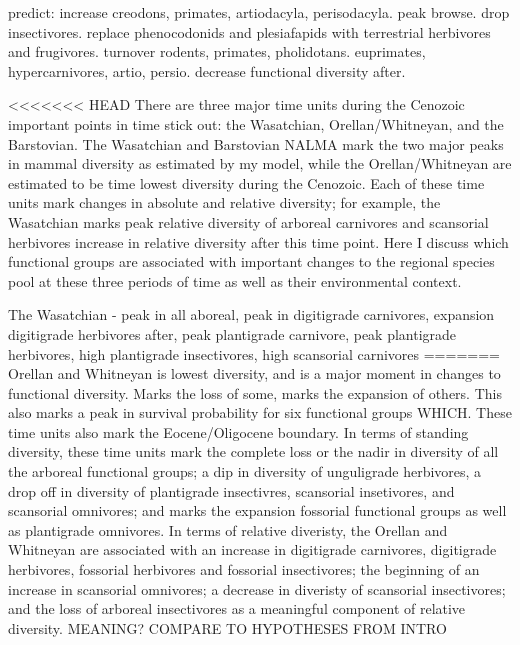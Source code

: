\documentclass[12pt,letterpaper]{article}
\begin{document}
predict: increase creodons, primates, artiodacyla, perisodacyla. peak browse. drop insectivores. replace phenocodonids and plesiafapids with terrestrial herbivores and frugivores. turnover rodents, primates, pholidotans. euprimates, hypercarnivores, artio, persio. decrease functional diversity after.



<<<<<<< HEAD
There are three major time units during the Cenozoic important points in time stick out: the Wasatchian, Orellan/Whitneyan, and the Barstovian. The Wasatchian and Barstovian NALMA mark the two major peaks in mammal diversity as estimated by my model, while the Orellan/Whitneyan are estimated to be time lowest diversity during the Cenozoic. Each of these time units mark changes in absolute and relative diversity; for example, the Wasatchian marks peak relative diversity of arboreal carnivores and scansorial herbivores increase in relative diversity after this time point. Here I discuss which functional groups are associated with important changes to the regional species pool at these three periods of time as well as their environmental context.



The Wasatchian
- peak in all aboreal, peak in digitigrade carnivores, expansion digitigrade herbivores after, peak plantigrade carnivore, peak plantigrade herbivores, high plantigrade insectivores, high scansorial carnivores
=======
Orellan and Whitneyan is lowest diversity, and is a major moment in changes to functional diversity. Marks the loss of some, marks the expansion of others. This also marks a peak in survival probability for six functional groups WHICH. These time units also mark the Eocene/Oligocene boundary. In terms of standing diversity, these time units mark the complete loss or the nadir in diversity of all the arboreal functional groups; a dip in diversity of unguligrade herbivores, a drop off in diversity of plantigrade insectivres, scansorial insetivores, and scansorial omnivores; and marks the expansion fossorial functional groups as well as plantigrade omnivores. In terms of relative diveristy, the Orellan and Whitneyan are associated with an increase in digitigrade carnivores, digitigrade herbivores, fossorial herbivores and fossorial insectivores; the beginning of an increase in scansorial omnivores; a decrease in diveristy of scansorial insectivores; and the loss of arboreal insectivores as a meaningful component of relative diversity. \uppercase{meaning? compare to hypotheses from intro}
\end{document}
